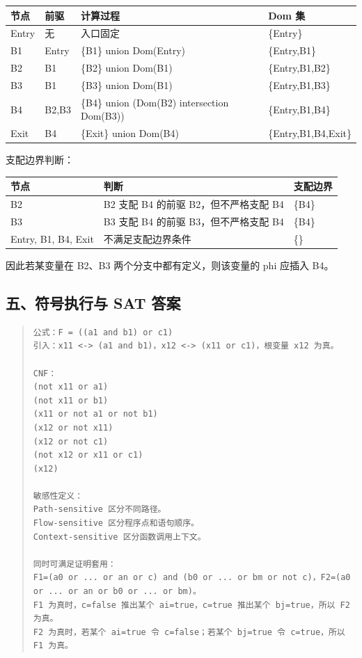 \documentclass[UTF8,zihao=-4]{ctexart}
\begin{document}
\begin{center}
\footnotesize
\begin{tabular}{llll}
\hline
节点 & 前驱 & 计算过程 & Dom 集 \\
\hline
Entry & 无 & 入口固定 & \{Entry\} \\
B1 & Entry & \{B1\} union Dom(Entry) & \{Entry,B1\} \\
B2 & B1 & \{B2\} union Dom(B1) & \{Entry,B1,B2\} \\
B3 & B1 & \{B3\} union Dom(B1) & \{Entry,B1,B3\} \\
B4 & B2,B3 & \{B4\} union (Dom(B2) intersection Dom(B3)) & \{Entry,B1,B4\} \\
Exit & B4 & \{Exit\} union Dom(B4) & \{Entry,B1,B4,Exit\} \\
\hline
\end{tabular}
\end{center}

支配边界判断：

\begin{center}
\footnotesize
\begin{tabular}{lll}
\hline
节点 & 判断 & 支配边界 \\
\hline
B2 & B2 支配 B4 的前驱 B2，但不严格支配 B4 & \{B4\} \\
B3 & B3 支配 B4 的前驱 B3，但不严格支配 B4 & \{B4\} \\
Entry, B1, B4, Exit & 不满足支配边界条件 & \{\} \\
\hline
\end{tabular}
\end{center}

因此若某变量在 B2、B3 两个分支中都有定义，则该变量的 phi 应插入 B4。



\subsection{五、符号执行与 SAT 答案}


\begin{quote}
\footnotesize
\begin{verbatim}
公式：F = ((a1 and b1) or c1)
引入：x11 <-> (a1 and b1)，x12 <-> (x11 or c1)，根变量 x12 为真。

CNF：
(not x11 or a1)
(not x11 or b1)
(x11 or not a1 or not b1)
(x12 or not x11)
(x12 or not c1)
(not x12 or x11 or c1)
(x12)

敏感性定义：
Path-sensitive 区分不同路径。
Flow-sensitive 区分程序点和语句顺序。
Context-sensitive 区分函数调用上下文。

同时可满足证明套用：
F1=(a0 or ... or an or c) and (b0 or ... or bm or not c)，F2=(a0 or ... or an or b0 or ... or bm)。
F1 为真时，c=false 推出某个 ai=true，c=true 推出某个 bj=true，所以 F2 为真。
F2 为真时，若某个 ai=true 令 c=false；若某个 bj=true 令 c=true，所以 F1 为真。
\end{verbatim}
\end{quote}
\end{document}
